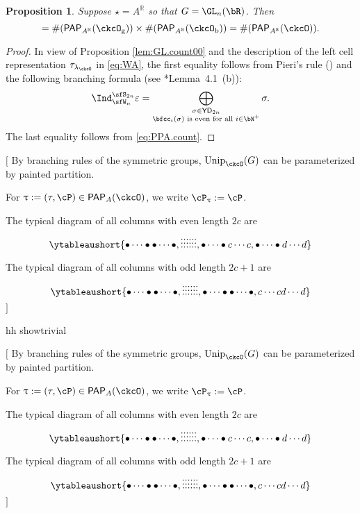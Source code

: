 \documentclass[12pt,a4paper]{amsart}
\let\ytb=\ytableaushort
\newcommand{\trivial}[2][]{\if\relax\detokenize{#1}\relax
  {%
      \color{orange} \vspace{0em} $[$  #2 $]$
      \color{black}
  }
  \else
\ifx#1h
\ifcsname showtrivial\endcsname
{%
    \color{orange} \vspace{0em}  $[$ #2 $]$
    \color{black}
}
\fi
\else {\red Wrong argument!} \fi
\fi
}
\newcommand{\CK}{{\mathcal {K}}}
\newcommand{\sgn}{\operatorname{sgn}}
\newcommand{\R}{\mathbb R}
\numberwithin{equation}{section}
\newtheorem{prop}[thm]{Proposition}
\theoremstyle{remark}
\def\Unip{\mathrm{Unip}}
\def\YD{\mathsf{YD}}
\def\lamck{\lambda_\ckcO}
\def\Wint#1{W_{[#1]}}
\def\Cint#1{\Coh_{[#1]}}
\def\PP{\mathsf{PAP}}
\def\Coh{\mathrm{Coh}}
\def\ckcOb{\ckcO_{\mathrm b}}
\def\ckcOg{\ckcO_{\mathrm g}}
\begin{document}
\begin{prop} \label{lem:GL.count}
  Suppose $\star=A^\R$ so that $G = \GL_{n}(\bR)$. Then
   \begin{equation*}%
    [\tau_{\lamck}: \Cint{\lamck}(\CK(G))] = \# (\PP_{A^\R}(\ckcOg))\times
    \# (\PP_{A^\R}(\ckcOb)) = \# (\PP_{A^\R}(\ckcO)).
  \end{equation*}
\end{prop}
\begin{proof}
  In view of Proposition \ref{lem:GL.count00} and the description of the left cell representation $\tau_{\lamck}$ in \eqref{eq:WA}, the  first equality  follows from  Pieri's rule (\cite[Corollary 9.2.4]{GW}) and
  the following branching formula (see \cite{BV.W}*{Lemma~4.1~(b)}):
\begin{equation}\label{IndFor}
  \Ind_{\sfW_{n}}^{\sfS_{2n}} \varepsilon = \bigoplus_{\substack{\sigma\in \YD_{2n}\\
      \bfcc_{i}(\sigma) \text{ is even for all }i\in \bN^+}} \sigma.
\end{equation}
The last equality
  follows from \eqref{eq:PPA.count}.
\end{proof}

\trivial[h]{
By branching rules of the symmetric groups, $\Unip_{\ckcO}(G)$ can be
parameterized by painted partition.

For $\uptau:=(\tau,\cP)\in \PP_{A}(\ckcO)$, we write $\cP_{\uptau}:= \cP$.

  The typical diagram of all columns with even length $2c$ are
  \[
    \ytb{\bullet\cdots\bullet\bullet\cdots\bullet,\vdots\vdots\vdots\vdots\vdots\vdots, \bullet\cdots\bullet c\cdots c, \bullet\cdots\bullet d\cdots d }
  \]

  The typical diagram of all columns with odd length $2c+1$ are
  \[
    \ytb{\bullet\cdots\bullet\bullet\cdots\bullet,\vdots\vdots\vdots\vdots\vdots\vdots, \bullet\cdots\bullet \bullet\cdots\bullet , c\cdots c d\cdots d }
  \]
}
\end{document}
